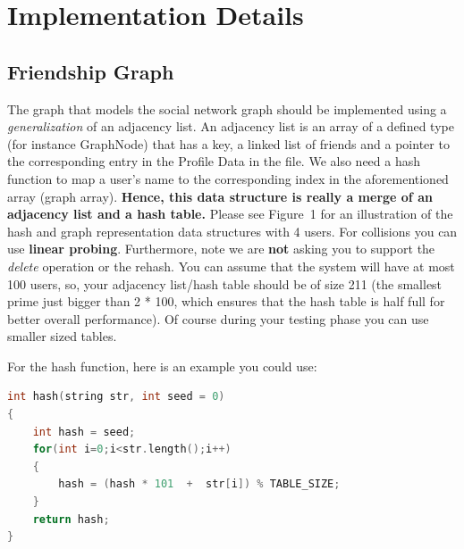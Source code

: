 \documentclass[times, 12pt]{article}
\begin{document}
\section{Implementation Details}
\subsection{Friendship Graph}
The graph that models the social network graph should be implemented using a {\em generalization} of an adjacency list. An adjacency list is an array of a defined type (for instance GraphNode) that has a key, a linked list of friends and a pointer to the corresponding entry in the Profile Data in the file.
We also need a hash function to map a user's name to the corresponding index in the aforementioned array (graph array). %
{\bf Hence, this data structure is really a merge of an adjacency list and a hash table.} Please see Figure~1 for an illustration of the hash and graph representation data structures with 4 users.  For collisions you can use {\bf linear probing}.  Furthermore, note we are {\bf not} asking you to support the {\em delete} operation or the rehash.  You can assume that the system will have at most 100 users, so, your adjacency list/hash table should be of size 211 (the smallest prime just bigger than 2 * 100, which ensures that the hash table is half full for better overall performance).  Of course during your testing phase you can use smaller sized tables.

%

\noindent For the hash function, here is an example you could use:

\begin{lstlisting}[language=C++,
    directivestyle={\color{black}}
    emph={int,char,double,float,unsigned},
    emphstyle={\color{green}}
   ]
int hash(string str, int seed = 0)
{
    int hash = seed;
    for(int i=0;i<str.length();i++)
    {
        hash = (hash * 101  +  str[i]) % TABLE_SIZE;
    }
    return hash;
}
\end{lstlisting}
\end{document}
